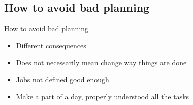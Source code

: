 \subsection{How to avoid bad planning}
\begin{frame}{How to avoid bad planning}{}
    \begin{itemize}
        \item Different consequences
        \item Does not necessarily mean change way things are done
        \item Jobs not defined good enough
        \item Make a part of a day, properly understood all the tasks
    \end{itemize}
\end{frame}
